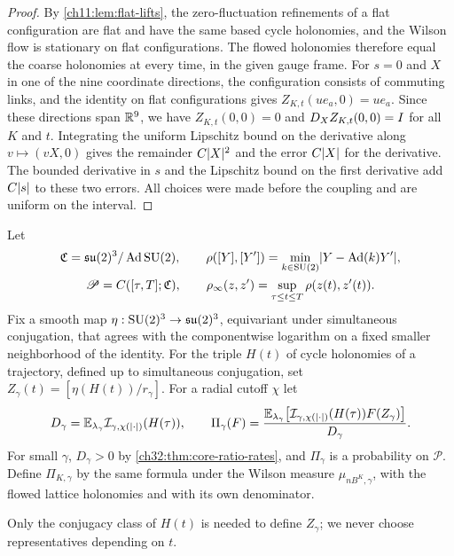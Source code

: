 \begin{proof}
By \cref{ch11:lem:flat-lifts}, the zero-fluctuation refinements of a flat configuration are flat and have the same based cycle holonomies, and the Wilson flow is stationary on flat configurations. The flowed holonomies therefore equal the coarse holonomies at every time, in the given gauge frame. For $s=0$ and $X$ in one of the nine coordinate directions, the configuration consists of commuting links, and the identity on flat configurations gives $Z_{K,t}(ue_a,0)=ue_a$. Since these directions span $\mathbb R^9$, we have $Z_{K,t}(0,0)=0$ and $D_XZ_{K,t}(0,0)=I$ for all $K$ and $t$. Integrating the uniform Lipschitz bound on the derivative along $v\mapsto(vX,0)$ gives the remainder $C\lvert X\rvert^2$ and the error $C\lvert X\rvert$ for the derivative. The bounded derivative in $s$ and the Lipschitz bound on the first derivative add $C\lvert s\rvert$ to these two errors. All choices were made before the coupling and are uniform on the interval.
\end{proof}

\begin{definition}\label{ch32:def:central-quotient-path}
Let
\[
 \begin{gathered}
 \mathfrak C=\mathfrak{su}(2)^3/\operatorname{Ad}\mathrm{SU}(2),\qquad\rho([Y],[Y'])=\min_{k\in\mathrm{SU}(2)}\lvert Y-\operatorname{Ad}(k)Y'\rvert,\\
 \mathscr P=C([\tau,T];\mathfrak C),\qquad\rho_\infty(z,z')=\sup_{\tau\le t\le T}\rho(z(t),z'(t)).
 \end{gathered}
\]
Fix a smooth map $\eta:\mathrm{SU}(2)^3\to\mathfrak{su}(2)^3$, equivariant under simultaneous conjugation, that agrees with the componentwise logarithm on a fixed smaller neighborhood of the identity. For the triple $H(t)$ of cycle holonomies of a trajectory, defined up to simultaneous conjugation, set $Z_\gamma(t)=[\eta(H(t))/r_\gamma]$. For a radial cutoff $\chi$ let
\[
 D_\gamma=\mathbb E_{\lambda_\gamma}\mathcal I_{\gamma,\chi(\lvert \cdot\rvert)}(H(\tau)),\qquad
 \Pi_\gamma(F)=\frac{\mathbb E_{\lambda_\gamma}\bigl[\mathcal I_{\gamma,\chi(\lvert \cdot\rvert)}(H(\tau))F(Z_\gamma)\bigr]}{D_\gamma}.
\]
For small $\gamma$, $D_\gamma>0$ by \cref{ch32:thm:core-ratio-rates}, and $\Pi_\gamma$ is a probability on $\mathscr P$. Define $\Pi_{K,\gamma}$ by the same formula under the Wilson measure $\mu_{nB^K,\gamma}$, with the flowed lattice holonomies and with its own denominator.
\end{definition}

Only the conjugacy class of $H(t)$ is needed to define $Z_\gamma$; we never choose representatives depending on $t$.

